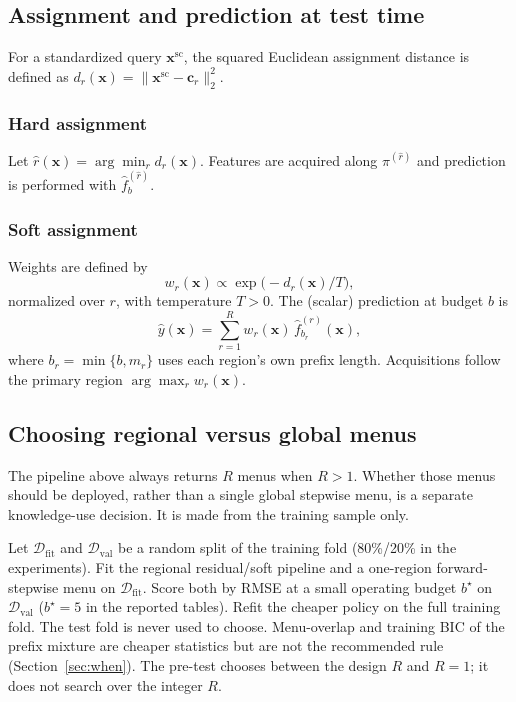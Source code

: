 \documentclass[pdflatex,sn-basic,Numbered]{sn-jnl}
\begin{document}
\subsection{Assignment and prediction at test time}

For a standardized query \(\mathbf{x}^{\mathrm{sc}}\), the squared Euclidean assignment distance is defined as \(d_r(\mathbf{x})=\|\mathbf{x}^{\mathrm{sc}}-\mathbf{c}_r\|_2^2\).

\subsubsection{Hard assignment}
Let \(\hat r(\mathbf{x})=\arg\min_r d_r(\mathbf{x})\). Features are acquired along \(\pi^{(\hat r)}\) and prediction is performed with \(\hat f^{(\hat r)}_b\).

\subsubsection{Soft assignment}
Weights are defined by
\[
w_r(\mathbf{x})\propto \exp\bigl(-d_r(\mathbf{x})/T\bigr),
\]
normalized over \(r\), with temperature \(T>0\). The (scalar) prediction at budget \(b\) is
\[
\hat y(\mathbf{x})=\sum_{r=1}^R w_r(\mathbf{x})\,\hat f^{(r)}_{b_r}(\mathbf{x}),
\]
where \(b_r=\min\{b, m_r\}\) uses each region's own prefix length. Acquisitions follow the primary region \(\arg\max_r w_r(\mathbf{x})\).

\subsection{Choosing regional versus global menus}
\label{sec:method-pretest}
The pipeline above always returns \(R\) menus when \(R>1\). Whether those menus should be deployed, rather than a single global stepwise menu, is a separate knowledge-use decision. It is made from the training sample only.

Let \(\mathcal{D}_{\mathrm{fit}}\) and \(\mathcal{D}_{\mathrm{val}}\) be a random split of the training fold (80\%/20\% in the experiments). Fit the regional residual/soft pipeline and a one-region forward-stepwise menu on \(\mathcal{D}_{\mathrm{fit}}\). Score both by RMSE at a small operating budget \(b^\star\) on \(\mathcal{D}_{\mathrm{val}}\) (\(b^\star=5\) in the reported tables). Refit the cheaper policy on the full training fold. The test fold is never used to choose. Menu-overlap and training BIC of the prefix mixture are cheaper statistics but are not the recommended rule (Section~\ref{sec:when}). The pre-test chooses between the design \(R\) and \(R=1\); it does not search over the integer \(R\).
\end{document}
